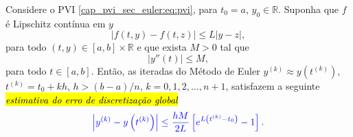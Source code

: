 \begin{teo}\label{cap_pvi_sec_euler:teo:conv}
  Considere o PVI \eqref{cap_pvi_sec_euler:eq:pvi}, para $t_0 = a$, $y_0\in\mathbb{R}$. Suponha que $f$ é Lipschitz contínua em $y$
  \begin{equation}
    |f(t, y) - f(t, z)| \leq L|y - z|,
  \end{equation}
  para todo $(t,y)\in [a, b]\times\mathbb{R}$ e que exista $M>0$ tal que
  \begin{equation}
    |y''(t)| \leq M,
  \end{equation}
  para todo $t\in [a, b]$. Então, as iteradas do Método de Euler $y^{(k)} \approx y\left(t^{(k)}\right)$, $t^{(k)} = t_0 + kh$, $h > (b-a)/n$, $k=0, 1, 2, \dotsc, n+1$, satisfazem a seguinte \hl{\emph{estimativa do erro de discretização global}}
  \begin{equation}\label{cap_pvi_sec_euler:eq:est_errg}\color{blue}\left|y^{(k)} - y\left(t^{(k)}\right)\right| \leq \frac{hM}{2L}\left[e^{L\left(t^{(k)}-t_0\right)}-1\right].
  \end{equation}
\end{teo}
